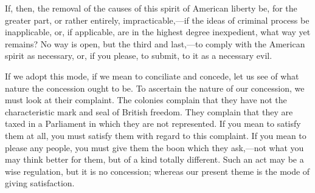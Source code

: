 If, then, the removal of the causes of this spirit of American liberty be, for the greater part, or rather entirely, impracticable,—if the ideas of criminal process be inapplicable, or, if applicable, are in the highest degree inexpedient, what way yet remains? No way is open, but the third and last,—to comply with the American spirit as necessary, or, if you please, to submit, to it as a necessary evil.

If we adopt this mode, if we mean to conciliate and concede, let us see of what nature the concession ought to be. To ascertain the nature of our concession, we must look at their complaint. The colonies complain that they have not the characteristic mark and seal of British freedom. They complain that they are taxed in a Parliament in which they are not represented. If you mean to satisfy them at all, you must satisfy them with regard to this complaint. If you mean to please any people, you must give them the boon which they ask,—not what you may think better for them, but of a kind totally different. Such an act may be a wise regulation, but it is no concession; whereas our present theme is the mode of giving satisfaction.


